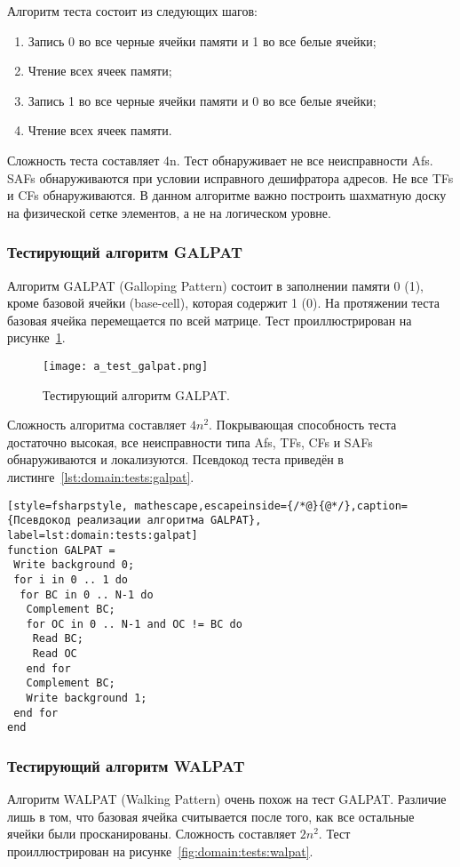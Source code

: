 Алгоритм теста состоит из следующих шагов:
\begin{enumerate}
\item Запись 0 во все черные ячейки памяти и 1 во все белые ячейки;
\item Чтение всех ячеек памяти;
\item Запись 1 во все черные ячейки памяти и 0 во все белые ячейки;
\item Чтение всех ячеек памяти.
\end{enumerate}

Сложность теста составляет 4n. Тест обнаруживает не все неисправности Afs. SAFs обнаруживаются при условии исправного дешифратора адресов. Не все TFs и CFs обнаруживаются. В данном алгоритме важно построить шахматную доску на физической сетке элементов, а не на логическом уровне.

\subsubsection{Тестирующий алгоритм GALPAT}
\label{sub:domain:tests:galpat}
Алгоритм GALPAT (Galloping Pattern) состоит в заполнении памяти 0 (1), кроме базовой ячейки (base-cell), которая содержит 1 (0). На протяжении теста базовая ячейка перемещается по всей матрице. Тест проиллюстрирован на рисунке~\ref{fig:domain:tests:galpat}.

\begin{figure}[ht]
\centering
  \texttt{[image: a\_test\_galpat.png]}  
  \caption{ Тестирующий алгоритм GALPAT. }
  \label{fig:domain:tests:galpat}
\end{figure}

Сложность алгоритма составляет $ 4n^{2} $. Покрывающая способность теста достаточно высокая, все неисправности типа Afs, TFs, CFs и SAFs обнаруживаются и локализуются. Псевдокод теста приведён в листинге~\ref{lst:domain:tests:galpat}.

\begin{lstlisting}[style=fsharpstyle, mathescape,escapeinside={/*@}{@*/},caption={Псевдокод реализации алгоритма GALPAT}, label=lst:domain:tests:galpat]
function GALPAT =
 Write background 0;
 for i in 0 .. 1 do
  for BC in 0 .. N-1 do
   Complement BC;
   for OC in 0 .. N-1 and OC != BC do
    Read BC;
    Read OC
   end for
   Complement BC;
   Write background 1;
 end for
end
\end{lstlisting}

\subsubsection{Тестирующий алгоритм WALPAT}
\label{sub:domain:tests:walpat}
Алгоритм WALPAT (Walking Pattern) очень похож на тест GALPAT. Различие лишь в том, что базовая ячейка считывается после того, как все остальные ячейки были просканированы. Сложность составляет $ 2n^{2} $. Тест проиллюстрирован на рисунке~\ref{fig:domain:tests:walpat}.

